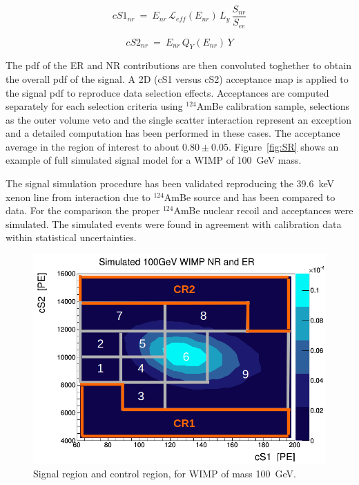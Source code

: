 \begin{equation}
cS1_{nr} ~=~ E_{nr} \, \mathcal{L}_{eff}(E_{nr}) \, L_{y} \, \frac{S_{nr}}{S_{ee}}
\label{f:cs1}
\end{equation}

\begin{equation}
cS2_{nr}  ~ = ~ E_{nr} \, Q_{Y}(E_{nr}) \, Y
\label{f:cs2}
\end{equation}

The pdf of the ER and NR contributions are then convoluted toghether to obtain the overall pdf of the signal.
A 2D (cS1 versus cS2) acceptance map is applied to the signal pdf to reproduce data selection effects. Acceptances are computed separately for each selection 
criteria using $^{124}$AmBe calibration sample, selections as the outer volume veto and the single scatter interaction represent an exception  and 
a detailed computation has been performed in these cases. The acceptance average in the region of interest to about $0.80 \pm 0.05$. 
Figure~\ref{fig:SR} shows an example of full simulated signal model for a WIMP of 100~GeV mass. 

The signal simulation procedure has been validated reproducing the 39.6~keV xenon line from interaction due to
$^{124}$AmBe source and has been compared to data. For the comparison the proper  $^{124}$AmBe nuclear recoil and acceptances
were simulated. The simulated events were found in agreement  with calibration data within statistical uncertainties.

\begin{figure}[t!]
  \includegraphics[width=\linewidth]{images/wimp_in_sr.png}
  \caption{Signal region and control region, for WIMP of mass 100~GeV.}
  \label{fig:SR2}
\end{figure}


